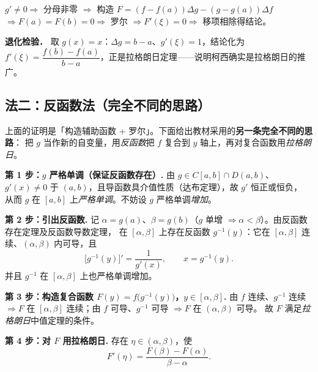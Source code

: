 \documentclass[11pt]{article}
\begin{document}
\begin{tcolorbox}[colback=boxbg,colframe=auxc!70,title={\bfseries 证明逻辑链}]
$g'\neq0\Rightarrow$ 分母非零 $\Rightarrow$ 构造 $F=(f-f(a))\Delta g-(g-g(a))\Delta f$
$\Rightarrow F(a)=F(b)=0\Rightarrow$ 罗尔 $\Rightarrow F'(\xi)=0\Rightarrow$ 移项相除得结论。
\end{tcolorbox}

\noindent\textbf{退化检验．} 取 $g(x)=x$：$\Delta g=b-a$、$g'(\xi)=1$，结论化为
$f'(\xi)=\dfrac{f(b)-f(a)}{b-a}$，正是拉格朗日定理——说明柯西确实是拉格朗日的推广。

\subsection*{法二：反函数法（完全不同的思路）}

\noindent 上面的证明是「构造辅助函数 + 罗尔」。下面给出教材采用的\textbf{另一条完全不同的思路}：
把 $g$ 当作新的自变量，用\emph{反函数}把 $f$ 复合到 $y$ 轴上，再对复合函数用\emph{拉格朗日}。

\vspace{2mm}
\noindent\textbf{第 1 步：$g$ 严格单调（保证反函数存在）.}
由 $g\in C[a,b]\cap D(a,b)$、$g'(x)\neq0$ 于 $(a,b)$，且导函数具介值性质（达布定理），故 $g'$ 恒正或恒负，
从而 $g$ 在 $[a,b]$ 上\emph{严格单调}。不妨设 $g$ 严格单调\emph{增加}。

\vspace{2mm}
\noindent\textbf{第 2 步：引出反函数.}
记 $\alpha=g(a)$、$\beta=g(b)$（$g$ 单增 $\Rightarrow \alpha<\beta$）。由反函数存在定理及反函数导数定理，
在 $[\alpha,\beta]$ 上存在反函数 $g^{-1}(y)$：它在 $[\alpha,\beta]$ 连续、$(\alpha,\beta)$ 内可导，且
\[
\big[g^{-1}(y)\big]'=\frac{1}{g'(x)},\qquad x=g^{-1}(y). \tag{1}
\]
并且 $g^{-1}$ 在 $[\alpha,\beta]$ 上也严格单调增加。

\vspace{2mm}
\noindent\textbf{第 3 步：构造复合函数 $F(y)=f\big(g^{-1}(y)\big)$，$y\in[\alpha,\beta]$.}
由 $f$ 连续、$g^{-1}$ 连续 $\Rightarrow F$ 在 $[\alpha,\beta]$ 连续；由 $f$ 可导、$g^{-1}$ 可导 $\Rightarrow F$ 在 $(\alpha,\beta)$ 可导。
故 $F$ 满足\emph{拉格朗日}中值定理的条件。

\vspace{2mm}
\noindent\textbf{第 4 步：对 $F$ 用拉格朗日.}
存在 $\eta\in(\alpha,\beta)$，使
\[
F'(\eta)=\frac{F(\beta)-F(\alpha)}{\beta-\alpha}.
\]
\end{document}
